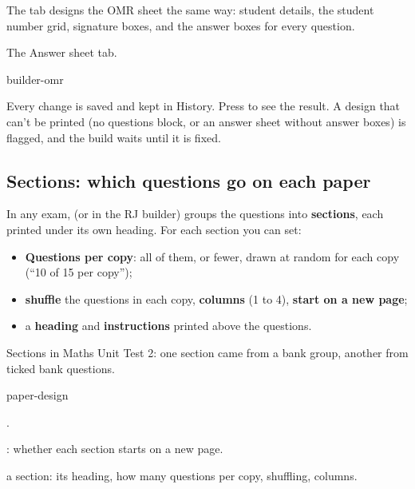 \documentclass[11pt]{article}
\begin{document}
The  tab designs the OMR sheet the same way: student details, the student number grid, signature boxes, and the answer boxes for every question.

\begin{guidefig}{The Answer sheet tab.}
\begin{shot}[0.9\linewidth]{builder-omr}
\end{shot}
\end{guidefig}

\begin{tip}
Every change is saved and kept in History. Press  to see the result. A design that can't be printed (no questions block, or an answer sheet without answer boxes) is flagged, and the build waits until it is fixed.
\end{tip}

\subsection{Sections: which questions go on each paper}\label{sec:sections}

In any exam,  \textrightarrow{}  (or  in the RJ builder) groups the questions into \textbf{sections}, each printed under its own heading. For each section you can set:

\begin{itemize}
  \item \textbf{Questions per copy}: all of them, or fewer, drawn at random for each copy (``10 of 15 per copy'');
  \item \textbf{shuffle} the questions in each copy, \textbf{columns} (1 to 4), \textbf{start on a new page};
  \item a \textbf{heading} and \textbf{instructions} printed above the questions.
\end{itemize}

\begin{keep}
\begin{guidefig}{Sections in Maths Unit Test 2: one section came from a bank group, another from ticked bank questions.}
\begin{shot}{paper-design}
\end{shot}
\end{guidefig}
\begin{callouts}
  \item {}.
  \item {}: whether each section starts on a new page.
  \item {} a section: its heading, how many questions per copy, shuffling, columns.
\end{callouts}
\end{keep}
\end{document}
